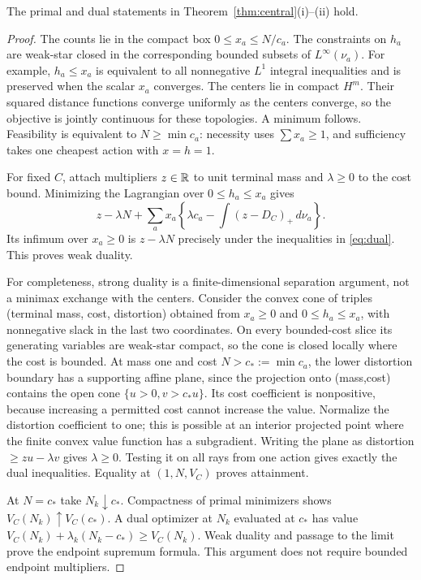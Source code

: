 \begin{lemma}\label{lem:dual}
The primal and dual statements in Theorem~\ref{thm:central}\textup{(i)--(ii)} hold.
\end{lemma}
\begin{proof}
The counts lie in the compact box $0\le x_a\le N/c_a$. The constraints on $h_a$ are weak-star closed in the corresponding bounded subsets of $L^\infty(\nu_a)$. For example, $h_a\le x_a$ is equivalent to all nonnegative $L^1$ integral inequalities and is preserved when the scalar $x_a$ converges. The centers lie in compact $H^m$. Their squared distance functions converge uniformly as the centers converge, so the objective is jointly continuous for these topologies. A minimum follows. Feasibility is equivalent to $N\ge\min c_a$: necessity uses $\sum x_a\ge1$, and sufficiency takes one cheapest action with $x=h=1$.

For fixed $C$, attach multipliers $z\in\mathbb R$ to unit terminal mass and $\lambda\ge0$ to the cost bound. Minimizing the Lagrangian over $0\le h_a\le x_a$ gives
\[
 z-\lambda N+\sum_a x_a\left\{\lambda c_a-\int(z-D_C)_+\,d\nu_a\right\}.
\]
Its infimum over $x_a\ge0$ is $z-\lambda N$ precisely under the inequalities in \eqref{eq:dual}. This proves weak duality.

For completeness, strong duality is a finite-dimensional separation argument, not a minimax exchange with the centers. Consider the convex cone of triples (terminal mass, cost, distortion) obtained from $x_a\ge0$ and $0\le h_a\le x_a$, with nonnegative slack in the last two coordinates. On every bounded-cost slice its generating variables are weak-star compact, so the cone is closed locally where the cost is bounded. At mass one and cost $N>c_*:=\min c_a$, the lower distortion boundary has a supporting affine plane, since the projection onto (mass,cost) contains the open cone $\{u>0,v>c_*u\}$. Its cost coefficient is nonpositive, because increasing a permitted cost cannot increase the value. Normalize the distortion coefficient to one; this is possible at an interior projected point where the finite convex value function has a subgradient. Writing the plane as distortion $\ge zu-\lambda v$ gives $\lambda\ge0$. Testing it on all rays from one action gives exactly the dual inequalities. Equality at $(1,N,V_C)$ proves attainment.

At $N=c_*$ take $N_k\downarrow c_*$. Compactness of primal minimizers shows $V_C(N_k)\uparrow V_C(c_*)$. A dual optimizer at $N_k$ evaluated at $c_*$ has value $V_C(N_k)+\lambda_k(N_k-c_*)\ge V_C(N_k)$. Weak duality and passage to the limit prove the endpoint supremum formula. This argument does not require bounded endpoint multipliers.
\end{proof}

